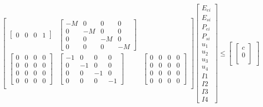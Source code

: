 \documentclass[11pt]{article} %
\begin{document}
\begin{align}
\begin{bmatrix}
\begin{bmatrix}
            0 & 0 & 0 & 1
        \end{bmatrix}   &
        \begin{bmatrix}
            -M & 0 & 0 & 0\\
            0 & -M & 0 & 0\\
            0 & 0 & -M & 0\\
            0 & 0 & 0 & -M
        \end{bmatrix} \\
        \begin{bmatrix}
            0 & 0 & 0 & 0\\
            0 & 0 & 0 & 0\\
            0 & 0 & 0 & 0\\
            0 & 0 & 0 & 0
        \end{bmatrix}  & 
        \begin{bmatrix}
            -1 & 0 & 0 & 0\\
            0 & -1 & 0 & 0\\
            0 & 0 & -1 & 0\\
            0 & 0 & 0 & -1
        \end{bmatrix}   &
        \begin{bmatrix}
            0 & 0 & 0 & 0\\
            0 & 0 & 0 & 0\\
            0 & 0 & 0 & 0\\
            0 & 0 & 0 & 0
        \end{bmatrix} \\
    \end{bmatrix}
    \begin{bmatrix}
        E_{ei} \\
        E_{si} \\
        P_{ei} \\
        P_{si} \\
        u_1\\
        u_2\\
        u_3\\
        u_4\\
        I1\\
        I2\\
        I3\\
        I4 
    \end{bmatrix} \leq
    \begin{bmatrix}
        \begin{bmatrix}
            c \\
             0 \\

\end{bmatrix}
\end{bmatrix}
\end{align}
\end{document}
